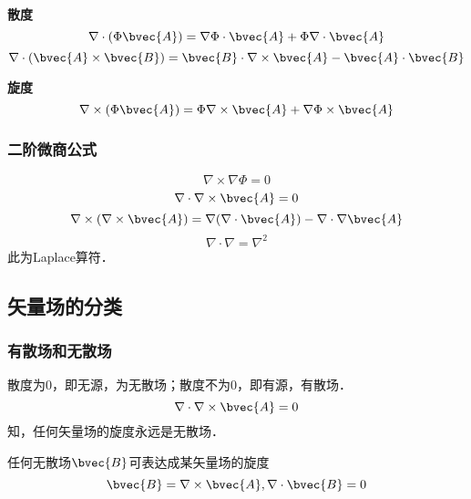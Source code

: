\textbf{散度}
\begin{equation}\label{VecAnl_eq17}
\nabla\cdot(\Phi\bvec{A})=\nabla\Phi\cdot\bvec{A}+\Phi\nabla\cdot\bvec{A}
\end{equation}
\begin{equation}\label{VecAnl_eq18}
\nabla\cdot(\bvec{A}\times\bvec{B})=\bvec{B}\cdot\nabla\times\bvec{A}-\bvec{A}\cdot\bvec{B}
\end{equation}

\textbf{旋度}
\begin{equation}\label{VecAnl_eq19}
\nabla\times(\Phi\bvec{A})=\Phi\nabla\times\bvec{A}+\nabla\Phi\times\bvec{A}
\end{equation}

\subsubsection{二阶微商公式}
\begin{equation}\label{VecAnl_eq20}
\nabla\times\nabla\Phi=0
\end{equation}
\begin{equation}\label{VecAnl_eq21}
\nabla\cdot\nabla\times\bvec{A}=0
\end{equation}
\begin{equation}\label{VecAnl_eq22}
\nabla\times(\nabla\times\bvec{A})=\nabla(\nabla\cdot\bvec{A})-\nabla\cdot\nabla\bvec{A}
\end{equation}
\begin{equation}\label{VecAnl_eq23}
\nabla\cdot\nabla=\nabla^2
\end{equation}
此为Laplace算符．

\subsection{矢量场的分类}
\subsubsection{有散场和无散场}
散度为0，即无源，为无散场；散度不为0，即有源，有散场．
\begin{equation}\label{VecAnl_eq24}
\nabla\cdot\nabla\times\bvec{A}=0
\end{equation}
知，任何矢量场的旋度永远是无散场．

任何无散场$\bvec{B}$可表达成某矢量场的旋度
\begin{equation}\label{VecAnl_eq25}
\bvec{B}=\nabla\times\bvec{A} ,\nabla\cdot\bvec{B}=0
\end{equation}

